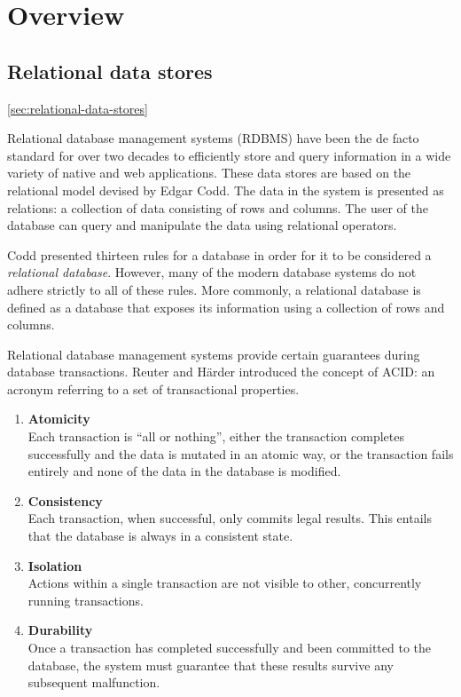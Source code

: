 \section{Overview}
\label{sec:overview}

\subsection{Relational data stores}
\ref{sec:relational-data-stores}

Relational database management systems (RDBMS) have been the de facto standard for over two decades to efficiently store and query information in a wide variety of native and web applications. These data stores are based on the relational model devised by Edgar Codd. The data in the system is presented as relations: a collection of data consisting of rows and columns. The user of the database can query and manipulate the data using relational operators.

Codd presented thirteen rules for a database in order for it to be considered a \textit{relational database}. However, many of the modern database systems do not adhere strictly to all of these rules. More commonly, a relational database is defined as a database that exposes its information using a collection of rows and columns.

Relational database management systems provide certain guarantees during database transactions. Reuter and H\"arder introduced the concept of ACID: an acronym referring to a set of transactional properties.

\begin{enumerate}
  \item \textbf{Atomicity} \\ Each transaction is ``all or nothing'', either the transaction completes successfully and the data is mutated in an atomic way, or the transaction fails entirely and none of the data in the database is modified.
  \item \textbf{Consistency} \\ Each transaction, when successful, only commits legal results. This entails that the database is always in a consistent state.
  \item \textbf{Isolation} \\ Actions within a single transaction are not visible to other, concurrently running transactions.
  \item \textbf{Durability} \\ Once a transaction has completed successfully and been committed to the database, the system must guarantee that these results survive any subsequent malfunction.
\end{enumerate}

